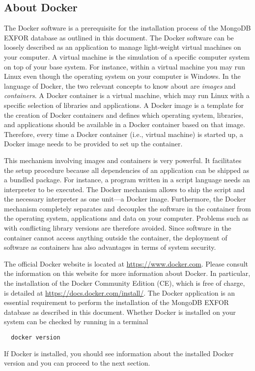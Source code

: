 \documentclass[12pt,a4paper]{scrartcl}
\begin{document}
 \subsection{About Docker}
 \label{subsec:about_docker}
 The Docker software is a prerequisite for the installation process of the MongoDB EXFOR database as outlined in this document.
 The Docker software can be loosely described as an application to manage light-weight virtual machines on your computer.
 A virtual machine is the simulation of a specific computer system on top of your base system.
 For instance, within a virtual machine you may run Linux even though the operating system on your computer is Windows.
 In the language of Docker, the two relevant concepts to know about are \textit{images} and \textit{containers}.
 A Docker container is a virtual machine, which may run Linux with a specific selection of libraries and applications.
 A Docker image is a template for the creation of Docker containers and defines which operating system, libraries, and applications should be available in a Docker container based on that image.
 Therefore, every time a Docker container (i.e., virtual machine) is started up, a Docker image needs to be provided to set up the container.

This mechanism involving images and containers is very powerful.
It facilitates the setup procedure because all dependencies of an application can be shipped as a bundled package.
For instance, a program written in a script language needs an interpreter to be executed.
The Docker mechanism allows to ship the script and the necessary interpreter as one unit---a Docker image.
Furthermore, the Docker mechanism completely separates and decouples the software in the container from the operating system, applications and data on your computer.
Problems such as with conflicting library versions are therefore avoided.
Since software in the container cannot access anything outside the container, the deployment of software as containers has also advantages in terms of system security.

The official Docker website is located at \url{https://www.docker.com}.
Please consult the information on this website for more information about Docker.
In particular, the installation of the Docker Community Edition (CE), which is free of charge, is detailed at \url{https://docs.docker.com/install/}.
The Docker application is an essential requirement to perform the installation of the MongoDB EXFOR database as described in this document.
Whether Docker is installed on your system can be checked by running in a terminal
\begin{verbatim}
  docker version
\end{verbatim}
If Docker is installed, you should see information about the installed Docker version and you can proceed to the next section.
\end{document}
